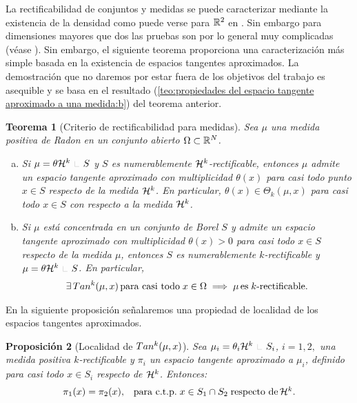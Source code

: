 \documentclass[a4paper,11pt,spanish, twoside, leqno]{tfm-uam}
\newtheorem{teo}{Teorema}[chapter]
\newtheorem{prop}[teo]{Proposición}
\begin{document}
La rectificabilidad de conjuntos y medidas se puede caracterizar mediante la existencia de la densidad como puede verse para $\mathbb{R}^{2}$ en \cite{falconer1986geometry, falconer2004fractal} . Sin embargo para dimensiones mayores que dos las pruebas son por lo general muy complicadas (véase \cite{federer2014geometric}). Sin embargo, el siguiente teorema proporciona una caracterización más simple basada en la existencia de espacios tangentes aproximados. La demostración que no daremos por estar fuera de los objetivos del trabajo es asequible y se basa en el resultado (\ref{teo:propiedades del espacio tangente aproximado a una medida:b}) del teorema anterior.
\begin{teo}[Criterio de rectificabilidad para medidas]\label{teo:criterio de rectificabilidad para medidas} 
Sea $\mu$ una medida positiva de Radon en un conjunto abierto $\Omega\subset \mathbb{R}^{N}$.
\begin{enumerate}[(a)]
\item Si $\mu=\theta \Hm{k}\Radot S$ y $S$ es numerablemente $\mathcal{H}^{k}$-rectificable, entonces $\mu$ admite un espacio tangente aproximado con multiplicidad $\theta(x)$ para casi todo punto $x\in S$ respecto de la medida $\mathcal{H}^{k}$. En particular, $\theta(x)\in \Theta_{k}(\mu,x)$ para casi todo $x\in S$ con respecto a la medida $\mathcal{H}^{k}$. \label{teo:criterio de rectificabilidad para medidas:a}
\item Si $\mu$ está concentrada en un conjunto de Borel $S$ y admite un espacio tangente aproximado con multiplicidad $\theta(x)>0$ para casi todo $x\in S$ respecto de la medida $\mu$, entonces $S$ es numerablemente $k$-rectificable y $\mu=\theta\Hm{k}\Radot S$. En particular,
\begin{align*}
\exists\, \Tan{k}{\mu}{x}\,  \text{para casi todo}\; x\in \Omega \implies \mu\, \text{es}\; k\text{-rectificable}.
\end{align*}\label{teo:criterio de rectificabilidad para medidas:b}
\end{enumerate}
\end{teo}
En la siguiente proposición señalaremos una propiedad de localidad de los espacios tangentes aproximados.
\begin{prop}[Localidad de $\Tan{k}{\mu}{x}$]\label{prop:localidad de espacio tangente aproximado}
Sea $\mu_{i}=\theta_{i}\Hm{k}\Radot S_{i}$, $i=1,2,$ una medida positiva $k$-rectificable y $\pi_{i}$ un espacio tangente aproximado a $\mu_{i}$, definido para casi todo $x\in S_{i}$ respecto de $\mathcal{H}^{k}$. Entonces:
\begin{align}\label{prop:localidad de espacio tangente aproximado:eq:1}
\displaystyle 
\begin{array}{ll}
\pi_{1}(x)=\pi_{2}(x),&\text{para c.t.p.}\; x\in S_{1}\cap S_{2}\; \text{respecto de}\, \mathcal{H}^{k}. 
\end{array}
\end{align}
\end{prop}
\end{document}
